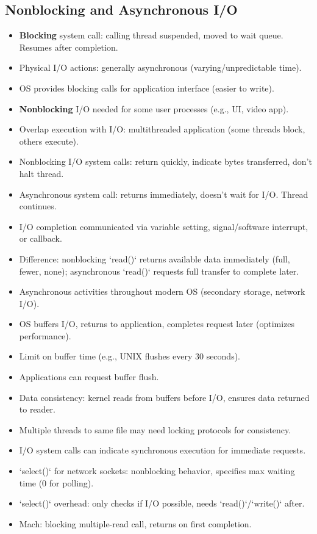 \subsection{Nonblocking and Asynchronous I/O}
\begin{itemize}
    \item \textbf{Blocking} system call: calling thread suspended, moved to wait queue. Resumes after completion.
    \item Physical I/O actions: generally asynchronous (varying/unpredictable time).
    \item OS provides blocking calls for application interface (easier to write).
    \item \textbf{Nonblocking} I/O needed for some user processes (e.g., UI, video app).
    \item Overlap execution with I/O: multithreaded application (some threads block, others execute).
    \item Nonblocking I/O system calls: return quickly, indicate bytes transferred, don't halt thread.
    \item Asynchronous system call: returns immediately, doesn't wait for I/O. Thread continues.
    \item I/O completion communicated via variable setting, signal/software interrupt, or callback.
    \item Difference: nonblocking `read()` returns available data immediately (full, fewer, none); asynchronous `read()` requests full transfer to complete later.
    \item Asynchronous activities throughout modern OS (secondary storage, network I/O).
    \item OS buffers I/O, returns to application, completes request later (optimizes performance).
    \item Limit on buffer time (e.g., UNIX flushes every 30 seconds).
    \item Applications can request buffer flush.
    \item Data consistency: kernel reads from buffers before I/O, ensures data returned to reader.
    \item Multiple threads to same file may need locking protocols for consistency.
    \item I/O system calls can indicate synchronous execution for immediate requests.
    \item `select()` for network sockets: nonblocking behavior, specifies max waiting time (0 for polling).
    \item `select()` overhead: only checks if I/O possible, needs `read()`/`write()` after.
    \item Mach: blocking multiple-read call, returns on first completion.
\end{itemize}


